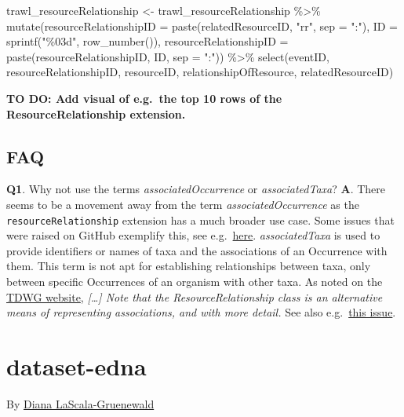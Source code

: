 \documentclass[
]{book}
\newenvironment{Shaded}{\begin{snugshade}}{\end{snugshade}}
\newcommand{\AttributeTok}[1]{\textcolor[rgb]{0.77,0.63,0.00}{#1}}
\newcommand{\FunctionTok}[1]{\textcolor[rgb]{0.00,0.00,0.00}{#1}}
\newcommand{\NormalTok}[1]{#1}
\newcommand{\OtherTok}[1]{\textcolor[rgb]{0.56,0.35,0.01}{#1}}
\newcommand{\SpecialCharTok}[1]{\textcolor[rgb]{0.00,0.00,0.00}{#1}}
\newcommand{\StringTok}[1]{\textcolor[rgb]{0.31,0.60,0.02}{#1}}
\begin{document}
\begin{Shaded}
\begin{Highlighting}[]
\NormalTok{trawl\_resourceRelationship }\OtherTok{\textless{}{-}}\NormalTok{ trawl\_resourceRelationship }\SpecialCharTok{\%\textgreater{}\%}
  \FunctionTok{mutate}\NormalTok{(}\AttributeTok{resourceRelationshipID =} \FunctionTok{paste}\NormalTok{(relatedResourceID, }\StringTok{"rr"}\NormalTok{, }\AttributeTok{sep =} \StringTok{":"}\NormalTok{),}
         \AttributeTok{ID =} \FunctionTok{sprintf}\NormalTok{(}\StringTok{"\%03d"}\NormalTok{, }\FunctionTok{row\_number}\NormalTok{()),}
         \AttributeTok{resourceRelationshipID =} \FunctionTok{paste}\NormalTok{(resourceRelationshipID, ID, }\AttributeTok{sep =} \StringTok{":"}\NormalTok{)) }\SpecialCharTok{\%\textgreater{}\%}
  \FunctionTok{select}\NormalTok{(eventID, resourceRelationshipID, resourceID, relationshipOfResource, relatedResourceID)}
\end{Highlighting}
\end{Shaded}

\textbf{TO DO: Add visual of e.g.~the top 10 rows of the ResourceRelationship extension.}

\hypertarget{faq}{%
\subsection{FAQ}\label{faq}}

\textbf{Q1}. Why not use the terms \emph{associatedOccurrence} or \emph{associatedTaxa}?
\textbf{A}. There seems to be a movement away from the term \emph{associatedOccurrence} as the \texttt{resourceRelationship} extension has a much broader use case. Some issues that were raised on GitHub exemplify this, see e.g.~\href{https://github.com/tdwg/dwc/issues/324}{here}. \emph{associatedTaxa} is used to provide identifiers or names of taxa and the associations of an Occurrence with them. This term is not apt for establishing relationships between taxa, only between specific Occurrences of an organism with other taxa. As noted on the \href{https://dwc.tdwg.org/terms/\#dwc:associatedTaxa}{TDWG website}, \emph{{[}\ldots{]} Note that the ResourceRelationship class is an alternative means of representing associations, and with more detail.} See also e.g.~\href{https://github.com/tdwg/dwc/issues/331}{this issue}.

\hypertarget{dataset-edna}{%
\section{dataset-edna}\label{dataset-edna}}

By \href{https://github.com/dianalg}{Diana LaScala-Gruenewald}
\end{document}
